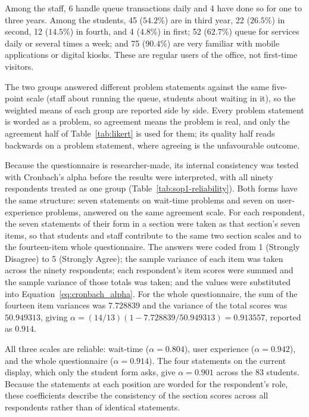 \documentclass{research}
\begin{document}
Among the staff, 6 handle queue transactions daily and 4 have done so
for one to three years. Among the students, 45 ($54.2\%$) are in third
year, 22 ($26.5\%$) in second, 12 ($14.5\%$) in fourth, and 4 ($4.8\%$)
in first; 52 ($62.7\%$) queue for services daily or several times a
week; and 75 ($90.4\%$) are very familiar with mobile applications or
digital kiosks. These are regular users of the office, not first-time
visitors.

The two groups answered different problem statements against the same
five-point scale (staff about running the queue, students about
waiting in it), so the weighted means of each group are reported side
by side. Every problem statement is worded as a problem, so agreement
means the problem is real, and only the agreement half of
Table~\ref{tab:likert} is used for them; its quality half reads
backwards on a problem statement, where agreeing is the unfavourable
outcome.

Because the questionnaire is researcher-made, its internal consistency
was tested with Cronbach's alpha before the results were interpreted,
with all ninety respondents treated as one group
(Table~\ref{tab:sop1-reliability}). Both forms have the same structure:
seven statements on wait-time problems and seven on user-experience
problems, answered on the same agreement scale. For each respondent, the
seven statements of their form in a section were taken as that section's
seven items, so that students and staff contribute to the same two
section scales and to the fourteen-item whole questionnaire. The answers
were coded from 1 (Strongly Disagree) to 5 (Strongly Agree); the sample
variance of each item was taken across the ninety respondents; each
respondent's item scores were summed and the sample variance of those
totals was taken; and the values were substituted into
Equation~\ref{eq:cronbach_alpha}. For the whole questionnaire, the sum of
the fourteen item variances was $7.728839$ and the variance of the total
scores was $50.949313$, giving
$\alpha = (14/13)(1 - 7.728839/50.949313) = 0.913557$, reported as
$0.914$.

All three scales are reliable: wait-time ($\alpha = 0.804$), user
experience ($\alpha = 0.942$), and the whole questionnaire
($\alpha = 0.914$). The four statements on the current display, which
only the student form asks, give $\alpha = 0.901$ across the 83
students. Because the statements at each position are worded for the
respondent's role, these coefficients describe the consistency of the
section scores across all respondents rather than of identical
statements.
\end{document}
